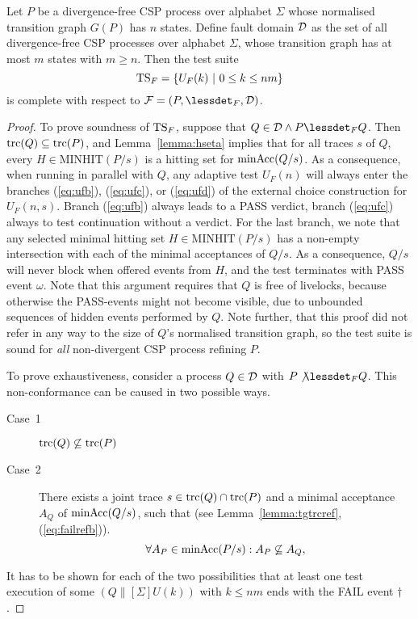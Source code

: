 \begin{theorem}
Let $P$ be a divergence-free CSP process over alphabet $\Sigma$ 
whose normalised transition graph $G(P)$ has $n$ states. Define fault domain ${\cal D}$ as
the set of all divergence-free CSP processes over alphabet $\Sigma$, whose transition graph
has at most $m$ states with $m \ge n$. 
Then the test suite 
\[
{\text{TS}}_F = \{ U_F(k)~|~0 \le k \le nm  \}
\]
is complete with respect to ${\cal F} = (P,\lessdet_F,{\cal D})$.
\end{theorem}
\begin{proof}
To prove soundness of ${\text{TS}}_F$, suppose that $Q\in{\cal D} \wedge P\lessdet_F Q$. Then
$\text{trc}(Q)\subseteq \text{trc}(P)$, and Lemma~\ref{lemma:hseta} implies that 
for all traces $s$ of $Q$, every $H\in\text{MINHIT}(P/s)$ is a 
    hitting set for $\text{minAcc}(Q/s)$. As a consequence, when running in parallel
with $Q$, any adaptive test $U_F(n)$ will always enter the branches 
(\ref{eq:ufb}), (\ref{eq:ufc}),  or (\ref{eq:ufd}) of the external choice construction
for $U_F(n,s)$. Branch (\ref{eq:ufb}) always leads to a PASS verdict, branch (\ref{eq:ufc})
always to test continuation without a verdict. For the last branch, we note that 
any selected minimal hitting set $H\in\text{MINHIT}(P/s)$ has a non-empty intersection with
each of the minimal acceptances of $Q/s$. As a consequence, $Q/s$ will never block when offered events from $H$, and the test terminates with PASS event $\omega$. Note that this argument requires that $Q$ is free of livelocks, because otherwise the PASS-events might not become visible, due to unbounded sequences of hidden events performed by $Q$. Note further, that this proof did not refer in any way to the size of $Q$'s normalised transition graph, so the test suite is sound for {\it all} non-divergent CSP process refining $P$.

To prove exhaustiveness, consider a process $Q\in{\cal D}$ with $P\not\lessdet_F Q$. This non-conformance can be caused in two possible ways.
\begin{description}
\item[Case~1] $\text{trc}(Q)\not\subseteq \text{trc}(P)$
\item[Case~2] There exists a joint trace $s\in\text{trc}(Q)\cap\text{trc}(P)$ and a minimal acceptance $A_Q$
of $\text{minAcc}(Q/s)$, such that 
(see Lemma~\ref{lemma:tgtrcref}, (\ref{eq:failrefb})).
\begin{equation}
\label{eq:accsnotcontained}
\forall A_P\in\text{minAcc}(P/s): A_P\not\subseteq A_Q,
\end{equation} 
\end{description}
It has to be shown for each of the two possibilities that at least one test execution of some $(Q\parallel[\Sigma] U(k))$ with $k\le nm$ ends with the FAIL event $\dag$.


\end{proof}
